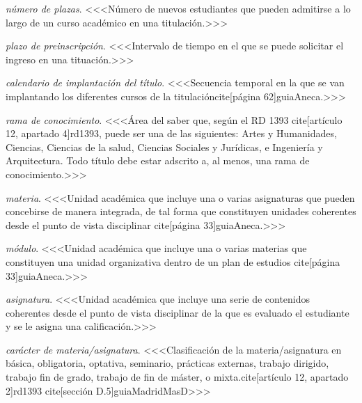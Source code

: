     \item \emph{número de plazas}. <<<Número de nuevos estudiantes que pueden admitirse a lo largo de un curso académico en una titulación.>>>

    \item \emph{plazo de preinscripción}. <<<Intervalo de tiempo en el que se puede solicitar el ingreso en una tituación.>>>

    \item \emph{calendario de implantación del título}. <<<Secuencia temporal en la que se van implantando los diferentes cursos de la titulacióncite[página 62]{guiaAneca}.>>>

    \item \emph{rama de conocimiento}. <<<Área del saber que, según el RD 1393 cite[artículo 12, apartado 4]{rd1393}, puede ser una de las siguientes: Artes y Humanidades, Ciencias, Ciencias de la salud, Ciencias Sociales y Jurídicas, e Ingeniería y Arquitectura. Todo título debe estar adscrito a, al menos, una rama de conocimiento.>>>

    \item \emph{materia}. <<<Unidad académica que incluye una o varias asignaturas que pueden concebirse de manera integrada, de tal forma que constituyen unidades coherentes desde el punto de vista disciplinar cite[página 33]{guiaAneca}.>>>

    \item \emph{módulo}. <<<Unidad académica que incluye una o varias materias que constituyen una unidad organizativa dentro de un plan de estudios cite[página 33]{guiaAneca}.>>>

    \item \emph{asignatura}. <<<Unidad académica que incluye una serie de contenidos coherentes desde el punto de vista disciplinar de la que es evaluado el estudiante y se le asigna una calificación.>>>

    \item \emph{carácter de materia/asignatura}. <<<Clasificación de la materia/asignatura en básica, obligatoria, optativa, seminario, prácticas externas, trabajo dirigido, trabajo fin de grado, trabajo de fin de máster, o mixta.cite[artículo 12, apartado 2]{rd1393} cite[sección D.5]{guiaMadridMasD}>>>

